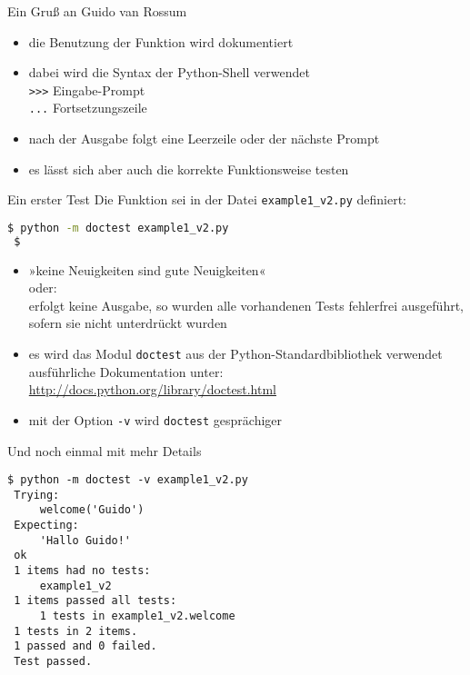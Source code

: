 \documentclass[t, utf8x, 10pt]{beamer}
\begin{document}
\begin{frame}{Ein Gruß an Guido van Rossum}
 

 \hrulefill
 \begin{itemize}
  \item die Benutzung der Funktion wird dokumentiert
  \item dabei wird die Syntax der Python-Shell verwendet\\
	\texttt{{>}{>}{>}} \quad Eingabe-Prompt\\
	\texttt{...} \quad Fortsetzungszeile
  \item nach der Ausgabe folgt eine Leerzeile oder der nächste Prompt
  \item \alert{es lässt sich aber auch die korrekte Funktionsweise testen}
 \end{itemize}
\end{frame}


\begin{frame}[fragile]{Ein erster Test}
 Die Funktion sei in der Datei \texttt{example1\_v2.py} definiert:

 \begin{lstlisting}[language=bash]
 $ python -m doctest example1_v2.py
 $ 
 \end{lstlisting}

 \begin{itemize}
  \item »keine Neuigkeiten sind gute Neuigkeiten«\\
	oder:\\
	erfolgt keine Ausgabe, so wurden alle vorhandenen Tests fehlerfrei
	ausgeführt, sofern sie nicht unterdrückt wurden
  \item es wird das Modul \texttt{doctest} aus der Python-Standardbibliothek
	verwendet\\
	ausführliche Dokumentation unter:
	\url{http://docs.python.org/library/doctest.html}
  \item mit der Option \texttt{-v} wird \texttt{doctest} gesprächiger
 \end{itemize}
\end{frame}


\begin{frame}[fragile]{Und noch einmal mit mehr Details}
	\begin{lstlisting}[language={}]
 $ python -m doctest -v example1_v2.py
 Trying:
     welcome('Guido')
 Expecting:
     'Hallo Guido!'
 ok
 1 items had no tests:
     example1_v2
 1 items passed all tests:
     1 tests in example1_v2.welcome
 1 tests in 2 items.
 1 passed and 0 failed.
 Test passed.
 \end{lstlisting}
\end{frame}
\end{document}
